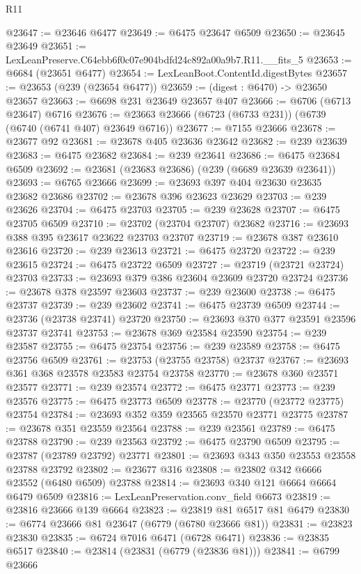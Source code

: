 \begin{lexlean}{R11}
\begin{coremodule}
@23647 := @23646 @6477
@23649 := @6475 @23647 @6509
@23650 := @23645 @23649
@23651 := LexLeanPreserve.C64ebb6f0c07e904bdfd24c892a00a9b7.R11.__fits_5
@23653 := @6684 (@23651 @6477)
@23654 := LexLeanBoot.ContentId.digestBytes
@23657 := @23653 (@239 (@23654 @6477))
@23659 := (digest : @6470) -> @23650 @23657
@23663 := @6698 @231 @23649 @23657 @407
@23666 := @6706 (@6713 @23647) @6716
@23676 := @23663 @23666 (@6723 (@6733 @231)) (@6739 (@6740 (@6741 @407) @23649 @6716))
@23677 := @7155 @23666
@23678 := @23677 @92
@23681 := @23678 @405 @23636 @23642
@23682 := @239 @23639
@23683 := @6475 @23682
@23684 := @239 @23641
@23686 := @6475 @23684 @6509
@23692 := @23681 (@23683 @23686) (@239 (@6689 @23639 @23641))
@23693 := @6765 @23666
@23699 := @23693 @397 @404 @23630 @23635 @23682 @23686
@23702 := @23678 @396 @23623 @23629
@23703 := @239 @23626
@23704 := @6475 @23703
@23705 := @239 @23628
@23707 := @6475 @23705 @6509
@23710 := @23702 (@23704 @23707) @23682
@23716 := @23693 @388 @395 @23617 @23622 @23703 @23707
@23719 := @23678 @387 @23610 @23616
@23720 := @239 @23613
@23721 := @6475 @23720
@23722 := @239 @23615
@23724 := @6475 @23722 @6509
@23727 := @23719 (@23721 @23724) @23703
@23733 := @23693 @379 @386 @23604 @23609 @23720 @23724
@23736 := @23678 @378 @23597 @23603
@23737 := @239 @23600
@23738 := @6475 @23737
@23739 := @239 @23602
@23741 := @6475 @23739 @6509
@23744 := @23736 (@23738 @23741) @23720
@23750 := @23693 @370 @377 @23591 @23596 @23737 @23741
@23753 := @23678 @369 @23584 @23590
@23754 := @239 @23587
@23755 := @6475 @23754
@23756 := @239 @23589
@23758 := @6475 @23756 @6509
@23761 := @23753 (@23755 @23758) @23737
@23767 := @23693 @361 @368 @23578 @23583 @23754 @23758
@23770 := @23678 @360 @23571 @23577
@23771 := @239 @23574
@23772 := @6475 @23771
@23773 := @239 @23576
@23775 := @6475 @23773 @6509
@23778 := @23770 (@23772 @23775) @23754
@23784 := @23693 @352 @359 @23565 @23570 @23771 @23775
@23787 := @23678 @351 @23559 @23564
@23788 := @239 @23561
@23789 := @6475 @23788
@23790 := @239 @23563
@23792 := @6475 @23790 @6509
@23795 := @23787 (@23789 @23792) @23771
@23801 := @23693 @343 @350 @23553 @23558 @23788 @23792
@23802 := @23677 @316
@23808 := @23802 @342 @6666 @23552 (@6480 @6509) @23788
@23814 := @23693 @340 @121 @6664 @6664 @6479 @6509
@23816 := LexLeanPreservation.conv_field @6673
@23819 := @23816 @23666 @139 @6664
@23823 := @23819 @81 @6517 @81 @6479
@23830 := @6774 @23666 @81 @23647 (@6779 (@6780 @23666 @81))
@23831 := @23823 @23830
@23835 := @6724 @7016 @6471 (@6728 @6471)
@23836 := @23835 @6517
@23840 := @23814 (@23831 (@6779 (@23836 @81)))
@23841 := @6799 @23666

\end{coremodule}
\end{lexlean}
